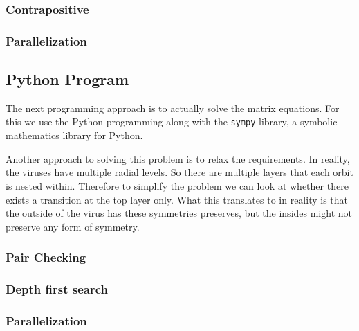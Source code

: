 \documentclass[a4paper,10pt]{article}
\theoremstyle{plain}
\theoremstyle{definition}
\theoremstyle{remark}
\begin{document}
\subsubsection{Contrapositive}

\subsubsection{Parallelization}

\subsection{Python Program}
The next programming approach is to actually solve the matrix equations.
For this we use the Python programming along with the \texttt{sympy} library, a symbolic mathematics library for Python.

Another approach to solving this problem is to relax the requirements.
In reality, the viruses have multiple radial levels.
So there are multiple layers that each orbit is nested within.
Therefore to simplify the problem we can look at whether there exists a transition at the top layer only.
What this translates to in reality is that the outside of the virus has these symmetries preserves, but the insides might not preserve any form of symmetry.

\subsubsection{Pair Checking}
\subsubsection{Depth first search}
\subsubsection{Parallelization}
\end{document}

